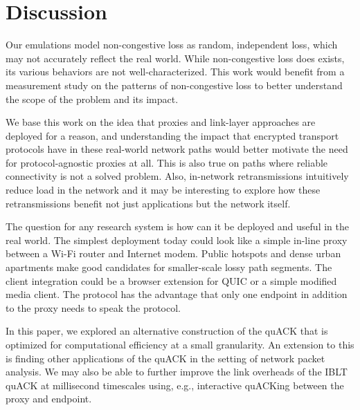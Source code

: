 \section{Discussion}

Our emulations model non-congestive loss as random, independent loss,
which may not accurately reflect the real world. While non-congestive loss
does exists, its various behaviors are not well-characterized. This work
would benefit from a measurement study on the patterns of non-congestive loss
to better understand the scope of the problem and its impact.

We base this work on the idea that proxies and link-layer approaches are
deployed for a reason, and understanding the impact that encrypted transport
protocols have in these real-world network paths would better motivate the need
for protocol-agnostic proxies at all. This is also true on paths where
reliable connectivity is not a solved problem. Also,
in-network retransmissions intuitively reduce load in the network and it may be
interesting to explore how these retransmissions benefit not just
applications but the network itself.

The question for any research system is how can it be deployed and useful in
the real world. The simplest deployment today could look like a simple in-line
\Sys proxy between a Wi-Fi router and Internet modem. Public hotspots and
dense urban apartments make good candidates for smaller-scale lossy path
segments.
The client integration could be a browser extension for QUIC or a simple
modified media client.
The \Sys protocol has the advantage that only one endpoint in addition to the
proxy needs to speak the protocol.

In this paper, we explored an alternative construction of the quACK that is
optimized for computational efficiency at a small granularity. An extension to
this is finding other applications of the quACK in the setting of network
packet analysis. We may also be able to further improve the link overheads of
the IBLT quACK at millisecond timescales using, e.g., interactive quACKing
between the proxy and endpoint.


